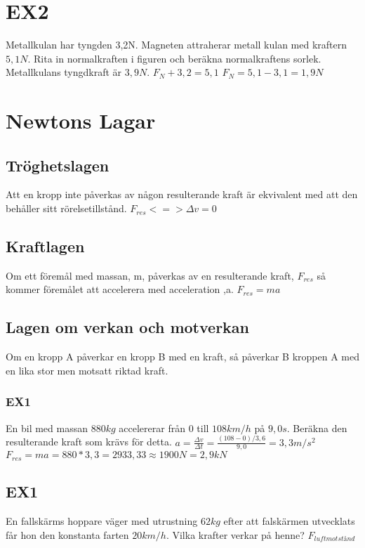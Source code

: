 \documentclass[a4paper,11pt]{article}
\begin{document}
\begin{flushleft}
\section{EX2}
Metallkulan har tyngden 3,2N. Magneten attraherar metall kulan med kraftern $ 5,1N $. Rita in normalkraften i figuren och beräkna normalkraftens sorlek. Metallkulans tyngdkraft är $ 3,9N $.\newline
$ F_N+3,2=5,1 $\newline
$ F_N=5,1-3,1=1,9N $
\section{Newtons Lagar}
\subsection{Tröghetslagen} Att en kropp inte påverkas av någon resulterande kraft är ekvivalent med att den behåller sitt rörelsetillstånd.\newline
$ F_{res}<=> \Delta v=0 $
\newline
\subsection{Kraftlagen}
Om ett föremål med massan, m, påverkas av en resulterande kraft, $ F_{res} $ så kommer föremålet att accelerera med acceleration ,a. $ F_{res}=ma $
\subsection{Lagen om verkan och motverkan}
Om en kropp A påverkar en kropp B med en kraft, så påverkar B kroppen A med en lika stor men motsatt riktad kraft.
\subsubsection{EX1}
En bil med massan $880kg$ accelererar från 0 till $108km/h$ på $9,0s$.\newline
Beräkna den resulterande kraft som krävs för detta.\newline
$ a=\frac{\Delta v}{\Delta t}=\frac{(108-0)/3,6}{9,0}=3,3m/s^2 $\newline
$ F_{res}=ma=880*3,3=2933,33\approx1900N=2,9kN $
\subsection{EX1}
En fallskärms hoppare väger med utrustning $62kg$ efter att falskärmen utvecklats får hon den konstanta farten $20km/h$.\newline
Vilka krafter verkar på henne?\newline
$F_{luftmotstånd} $

\end{flushleft}
\end{document}

